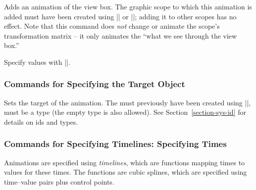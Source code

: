 \begin{command}{\pgfsys@animateviewbox}
  Adds an animation of the view box. The graphic scope to which this
  animation is added must have been created using
  |\pgfsys@viewboxmeet| or |\pgfsys@viewboxslice|; adding it to other
  scopes has no effect. Note that this command does \emph{not}
  change or animate the scope's transformation matrix -- it only animates the
  ``what we see through the view box.''
  
  Specify values with |\pgfsys@animation@viewbox|.
\begin{codeexample}[width=5cm]
\end{codeexample}
\end{command}


\subsubsection{Commands for Specifying the Target Object}

\begin{command}{\pgfsys@animation@whom{}}
  Sets the target of the animation. The  must previously have
  been created using |\pgfsys@new@id|,  must be a type (the
  empty type is also allowed). See Section~\ref{section-sys-id} for
  details on ids and types.
\end{command}




\subsubsection{Commands for Specifying Timelines: Specifying Times}

Animations are specified using \emph{timelines}, which are functions
mapping times to values for these times. The functions are cubic
splines, which are specified using time--value pairs plus control
points.

